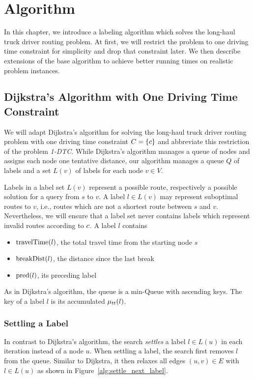 
\chapter{Algorithm}
\label{ch:Algorithm}
In this chapter, we introduce a labeling algorithm which solves the long-haul truck driver routing problem. At first, we will restrict the problem to one driving time constraint for simplicity and drop that constraint later. We then describe extensions of the base algorithm to achieve better running times on realistic problem instances.

\section{Dijkstra's Algorithm with One Driving Time Constraint\label{sec:dijkstra_csp}}
We will adapt Dijkstra's algorithm for solving the long-haul truck driver routing problem with one driving time constraint $C = \{c\}$ and abbreviate this restriction of the problem \emph{1-DTC}. While Dijkstra's algorithm manages a queue of nodes and assigns each node one tentative distance, our algorithm manages a queue $Q$ of labels and a set $L(v)$ of labels for each node $v \in V$.

Labels in a label set $L(v)$ represent a possible route, respectively a possible solution for a query from $s$ to $v$. A label $l \in L(v)$ may represent suboptimal routes to $v$, i.e., routes which are not a shortest route between $s$ and $v$. Nevertheless, we will ensure that a label set never contains labels which represent invalid routes according to $c$. A label $l$ contains

\begin{itemize}
	\item $\operatorname{travelTime}(l)$, the total travel time from the starting node $s$
	\item $\operatorname{breakDist}(l)$, the distance since the last break
	\item $\operatorname{pred}(l)$, its preceding label
\end{itemize}

As in Dijkstra's algorithm, the queue is a min-Queue with ascending keys. The key of a label $l$ is its accumulated $\mu_{tt}(l)$.

\subsection{Settling a Label}
In contrast to Dijkstra's algorithm, the search \emph{settles} a label $l \in L(u)$ in each iteration instead of a node $u$. When settling a label, the search first removes $l$ from the queue. Similar to Dijkstra, it then relaxes all edges $(u,v) \in E$ with $l \in L(u)$ as shown in Figure~\ref{alg:settle_next_label}.

